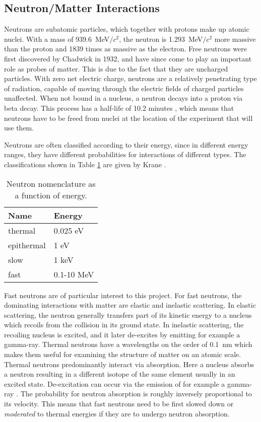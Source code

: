 \documentclass[main.tex]{subfiles}
\begin{document}
\subsection{Neutron/Matter Interactions}\label{sec:neutronMatterInteractions}
Neutrons are subatomic particles, which together with protons make up atomic nuclei. With a mass of \SI{939.6}{\MeV}$/c^\textrm{2}$, the neutron is \SI{1.293}{\MeV}$/c^\textrm{2}$ more massive than the proton and 1839 times as massive as the electron. 
Free neutrons were first discovered by Chadwick in 1932, and have since come to play an important role as probes of matter. This is due to the fact that they are uncharged particles. With zero net electric charge, neutrons are a relatively penetrating type of radiation, capable of moving through the electric fields of charged particles unaffected. When not bound in a nucleus, a neutron decays into a proton via beta decay. This process has a half-life of 10.2 minutes \cite{Nudat}, which means that neutrons have to be freed from nuclei at the location of the experiment that will use them.

Neutrons are often classified according to their energy, since in different energy ranges, they have different probabilities for interactions of different types. The classifications shown in Table \ref{tab:neutron} are given by Krane \cite{Krane}. 
\begin{table}[h]
\center
\begin{tabular}{|l|l|}
\hline
\textbf{Name} & \textbf{Energy} \\ \hline
thermal       & 0.025 eV        \\ \hline
epithermal    & 1 eV            \\ \hline
slow          & 1 keV           \\ \hline
fast          & 0.1-10 MeV      \\ \hline
\end{tabular}
\caption[Neutron nomenclature as a function of energy.]{Neutron nomenclature as a function of energy.}
\label{tab:neutron}
\end{table}
Fast neutrons are of particular interest to this project. For fast neutrons, the dominating interactions with matter are elastic and inelastic scattering. In elastic scattering, the neutron generally transfers part of its kinetic energy to a nucleus which recoils from the collision in its ground state. In inelastic scattering, the recoiling nucleus is excited, and it later de-excites by emitting for example a gamma-ray. Thermal neutrons have a wavelengths on the order of \SI{0.1}{nm} which makes them useful for examining the structure of matter on an atomic scale. 
Thermal neutrons predominantly interact via absorption. Here a nucleus absorbs a neutron resulting in a different isotope of the same element usually in an excited state. De-excitation can occur via the emission of for example a gamma-ray \cite{Leo}. The probability for neutron absorption is roughly inversely proportional to its velocity. This means that fast neutrons need to be first slowed down or \textit{moderated} to thermal energies if they are to undergo neutron absorption. 
\end{document}

